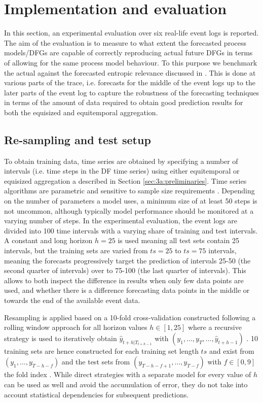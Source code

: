 \section{Implementation and evaluation}\label{sec:experiment}
In this section, an experimental evaluation over six real-life event logs is reported.
The aim of the evaluation is to measure to what extent the forecasted process models/DFGs are capable of correctly reproducing actual future DFGs in terms of allowing for the same process model behaviour.
To this purpose we benchmark the actual against the forecasted entropic relevance discussed in .
This is done at various parts of the trace, i.e. forecasts for the middle of the event logs up to the later parts of the event log to capture the robustness of the forecasting techniques in terms of the amount of data required to obtain good prediction results for both the equisized and equitemporal aggregation.

\subsection{Re-sampling and test setup}
To obtain training data, time series are obtained by specifying a number of intervals (i.e. time steps in the DF time series) using either equitemporal or equisized aggregation a described in Section \ref{sec:3a:preliminaries}.
Time series algorithms are parametric and sensitive to sample size requirements \cite{hanke2001business}.
Depending on the number of parameters a model uses, a minimum size of at least 50 steps is not uncommon, although typically model performance should be monitored at a varying number of steps.
In the experimental evaluation, the event logs are divided into 100 time intervals with a varying share of training and test intervals. A constant and long horizon $h=25$ is used meaning all test sets contain 25 intervals, but the training sets are varied from $ts=25$ to $ts=75$ intervals, meaning the forecasts progressively target the prediction of intervals 25-50 (the second quarter of intervals) over to 75-100 (the last quarter of intervals).
This allows to both inspect the difference in results when only few data points are used, and whether there is a difference forecasting data points in the middle or towards the end of the available event data.

Resampling is applied based on a 10-fold cross-validation constructed following a rolling window approach for all horizon values $h\in[1,25]$ where a recursive strategy is used to iteratively obtain $\hat{y}_{t+h|T_{t+h-1}}$ with $(y_1,\dots,y_{T},\dots,\hat{y}_{t+h-1})$ \cite{weigend2018time}.
10 training sets are hence constructed for each training set length $ts$ and exist from $(y_1,\dots,y_{T-h-f})$ and the test sets from $(y_{T-h-f+1},\dots,y_{T-f})$ with $f\in[0,9]$ the fold index \cite{bergmeir2012use}.
While direct strategies with a separate model for every value of $h$ can be used as well and avoid the accumulation of error, they do not take into account statistical dependencies for subsequent predictions.

